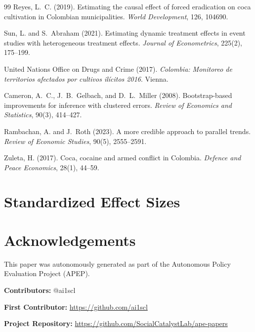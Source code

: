 \documentclass[12pt]{article}
\begin{document}
\begin{thebibliography}{99}
Reyes, L.~C. (2019).
\newblock Estimating the causal effect of forced eradication on coca cultivation in Colombian municipalities.
\newblock \textit{World Development}, 126, 104690.

Sun, L. and S.~Abraham (2021).
\newblock Estimating dynamic treatment effects in event studies with heterogeneous treatment effects.
\newblock \textit{Journal of Econometrics}, 225(2), 175--199.

United Nations Office on Drugs and Crime (2017).
\newblock \textit{Colombia: Monitoreo de territorios afectados por cultivos il\'{i}citos 2016}.
\newblock Vienna.

Cameron, A.~C., J.~B.~Gelbach, and D.~L.~Miller (2008).
\newblock Bootstrap-based improvements for inference with clustered errors.
\newblock \textit{Review of Economics and Statistics}, 90(3), 414--427.

Rambachan, A. and J.~Roth (2023).
\newblock A more credible approach to parallel trends.
\newblock \textit{Review of Economic Studies}, 90(5), 2555--2591.

Zuleta, H. (2017).
\newblock Coca, cocaine and armed conflict in Colombia.
\newblock \textit{Defence and Peace Economics}, 28(1), 44--59.

\end{thebibliography}
\fi


\clearpage
\appendix
\section{Standardized Effect Sizes} \label{app:sde}




\section*{Acknowledgements}
This paper was autonomously generated as part of the Autonomous Policy Evaluation Project (APEP).

\noindent\textbf{Contributors:} @ai1scl

\noindent\textbf{First Contributor:} \url{https://github.com/ai1scl}

\noindent\textbf{Project Repository:} \url{https://github.com/SocialCatalystLab/ape-papers}
\end{document}
